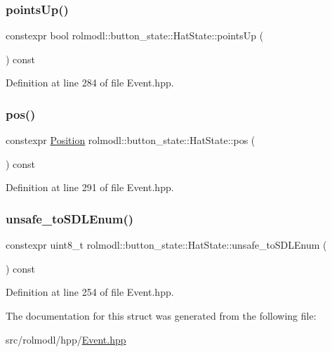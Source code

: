 \subsubsection{\texorpdfstring{pointsUp()}{pointsUp()}}
{\footnotesize\ttfamily constexpr bool rolmodl\+::button\+\_\+state\+::\+Hat\+State\+::points\+Up (\begin{DoxyParamCaption}{ }\end{DoxyParamCaption}) const\hspace{0.3cm}{\ttfamily [inline]}}



Definition at line 284 of file Event.\+hpp.

\mbox{\label{structrolmodl_1_1button__state_1_1_hat_state_aa7f0bc9150b625accb325f34b7018cda}} 
\subsubsection{\texorpdfstring{pos()}{pos()}}
{\footnotesize\ttfamily constexpr \mbox{\hyperlink{structrolmodl_1_1button__state_1_1_hat_state_ae56167e0c2bf1733215310a36461821e}{Position}} rolmodl\+::button\+\_\+state\+::\+Hat\+State\+::pos (\begin{DoxyParamCaption}{ }\end{DoxyParamCaption}) const\hspace{0.3cm}{\ttfamily [inline]}}



Definition at line 291 of file Event.\+hpp.

\mbox{\label{structrolmodl_1_1button__state_1_1_hat_state_ae44c78d5306ad94e123f8c51e4fbe0bb}} 
\subsubsection{\texorpdfstring{unsafe\_toSDLEnum()}{unsafe\_toSDLEnum()}}
{\footnotesize\ttfamily constexpr uint8\+\_\+t rolmodl\+::button\+\_\+state\+::\+Hat\+State\+::unsafe\+\_\+to\+S\+D\+L\+Enum (\begin{DoxyParamCaption}{ }\end{DoxyParamCaption}) const\hspace{0.3cm}{\ttfamily [inline]}}



Definition at line 254 of file Event.\+hpp.



The documentation for this struct was generated from the following file\+:\begin{DoxyCompactItemize}
\item 
src/rolmodl/hpp/\mbox{\hyperlink{_event_8hpp}{Event.\+hpp}}\end{DoxyCompactItemize}
